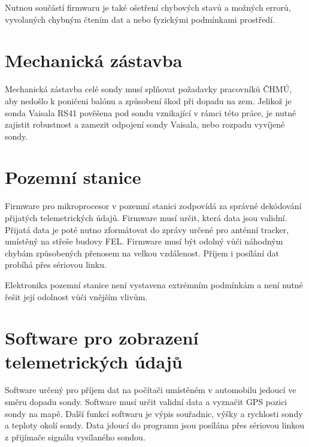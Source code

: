 \documentclass[twoside]{ctuthesis}
\theoremstyle{plain}
\theoremstyle{definition}
\theoremstyle{note}
\begin{document}
	Nutnou součástí firmwaru je také ošetření chybových stavů a možných errorů, vyvolaných chybným čtením dat a nebo fyzickými podmínkami prostředí.

	\section{Mechanická zástavba}
	Mechanická zástavba celé sondy musí splňovat požadavky pracovníků ČHMÚ, aby nedošlo k poničeni balónu a způsobení škod při dopadu na zem. Jelikož je sonda Vaisala RS41 pověšena pod sondu vznikající v rámci této práce, je nutné zajistit robustnost a zamezit odpojení sondy Vaisala, nebo rozpadu vyvíjené sondy.



	\section{Pozemní stanice}
	\label{sec:navrh:pozemni_stanice}
	Firmware pro mikroprocesor v pozemní stanici zodpovídá za správné dekódování přijatých telemetrických údajů. Firmware musí určit, která data jsou validní. Přijatá data je poté nutno zformátovat do zprávy určené pro anténní tracker, umístěný na střeše budovy FEL. Firmware musí být odolný vůči náhodným chybám způsobených přenosem na velkou vzdálenost. Příjem i posílání dat probíhá přes sériovou linku. 

	Elektronika pozemní stanice není vystavena extrémním podmínkám a není nutné řešit její odolnost vůči vnějším vlivům. 
	

	\section{Software pro zobrazení telemetrických údajů}
	Software určený pro příjem dat na počítači umístěném v automobilu jedoucí ve směru dopadu sondy. Software musí určit validní data a vyznačit GPS pozici sondy na mapě. Další funkcí softwaru je výpis souřadnic, výšky a rychlosti sondy a teploty okolí sondy. Data jdoucí do programu jsou posílána přes sériovou linkou z přijímače signálu vysílaného sondou. 

	
	
\end{document}
